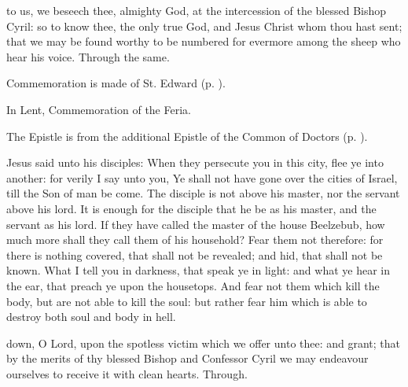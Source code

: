 \collect\label{CyrilCollect}
 to us, we beseech thee, almighty God, at the intercession of the blessed Bishop Cyril: so to know thee, the only true God, and Jesus Christ whom thou hast sent; that we may be found worthy to be numbered for evermore among the sheep who hear his voice. Through the same.

\begin{rubric}
	Commemoration is made of St. Edward (p. \pageref{EdwardCollect}).
\end{rubric}
\begin{rubric}
	In Lent, Commemoration of the Feria.
\end{rubric}

\begin{rubric}
	The Epistle is from the additional Epistle of the Common of Doctors (p. \pageref{CommonDoctors}).
\end{rubric}


 Jesus said unto his disciples: When they persecute you in this city, flee ye into another: for verily I say unto you, Ye shall not have gone over the cities of Israel, till the Son of man be come. The disciple is not above his master, nor the servant above his lord. It is enough for the disciple that he be as his master, and the servant as his lord. If they have called the master of the house Beelzebub, how much more shall they call them of his household? Fear them not therefore: for there is nothing covered, that shall not be revealed; and hid, that shall not be known. What I tell you in darkness, that speak ye in light: and what ye hear in the ear, that preach ye upon the housetops. And fear not them which kill the body, but are not able to kill the soul: but rather fear him which is able to destroy both soul and body in hell.


\secret\label{CyrilSecret}
 down, O Lord, upon the spotless victim which we offer unto thee: and grant; that by the merits of thy blessed Bishop and Confessor Cyril we may endeavour ourselves to receive it with clean hearts. Through.

